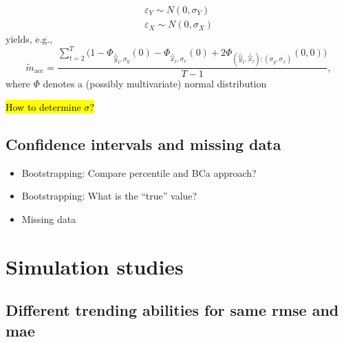 \documentclass[oneside]{article}
\theoremstyle{plain}%
\theoremstyle{definition}
\newcommand{\ydiff}{\overset{\triangle}{y}}
\newcommand{\xdiff}{\overset{\triangle}{x}}
\newcommand{\mprob}{\tilde{m}}
\begin{document}
\begin{itemize}
\begin{itemize}
  \begin{align}
	  \varepsilon_Y \sim N(0, \sigma_Y) \\
	  \varepsilon_X \sim N(0, \sigma_X)
  \end{align}
  yields, e.g.,
  	\begin{equation}
  		\mprob_{\text{acc}} = \frac{\sum_{t=2}^T  \big( 1 - \Phi_{\ydiff_t, \sigma_y}(0) - \Phi_{\xdiff_t, \sigma_x} (0) + 2 \Phi_{(\ydiff_t, \xdiff_t); (\sigma_y, \sigma_x)}( 0, 0) \big) }{T-1}, 
	\end{equation}
	where $\Phi$ denotes a (possibly multivariate) normal distribution
\end{itemize}
\end{itemize}


\hl{How to determine $\sigma$?}

\subsection{Confidence intervals and missing data}

\begin{itemize}
  \item Bootstrapping: Compare percentile and BCa approach?
  \item Bootstrapping: What is the \enquote{true} value?
  \item Missing data
\end{itemize}


\section{Simulation studies}

\subsection{Different trending abilities for same rmse and mae} \label{sec:simulation_rmse_mae}
\end{document}
